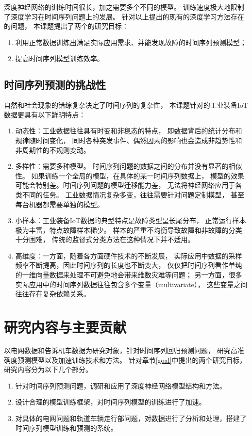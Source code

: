     深度神经网络的训练时间很长，加之需要多个不同的模型。
    训练速度极大地限制了深度学习在时间序列问题上的发展。
    针对以上提出的现有的深度学习方法存在的问题，
    本课题提出了两个的研究目标：
    \begin{enumerate}[(1)]
      \item 利用正常数据训练出满足实际应用需求、并能发现故障的时间序列预测模型；
      \item 提高时间序列模型训练效率。
    \end{enumerate}


  \subsection{时间序列预测的挑战性}
    自然和社会现象的错综复杂决定了时间序列的复杂性，
    本课题针对的工业装备IoT数据更具有以下鲜明特点：
    \begin{enumerate}[(1)]
      \item 动态性：工业数据往往具有时变和非稳态的特点，
      即数据背后的统计分布和规律随时间变化，
      同时各种突发事件、偶然因素的影响也会造成非趋势性和非周期性的不规则变动。
      \item 多样性：需要多种模型。
      时间序列问题的数据之间的分布并没有显著的相似性。
      如果训练一个全局的模型，在具体的某一时间序列数据上，
      模型的效果可能会特别差。时间序列问题的模型迁移能力差，
      无法将神经网络应用于各类不同的任务。
      工业数据情况复杂多变，往往需要针对问题定制模型，
      甚至每台机器都需要单独的模型。
      \item 小样本：工业装备IoT数据的典型特点是故障类型呈长尾分布，
      正常运行样本极为丰富，特点故障样本稀少。
      样本的严重不均衡导致故障和非故障的分类十分困难，
      传统的监督式分类方法在这种情况下并不适用。
      \item 高维度：一方面，随着各方面硬件技术的不断发展，
      实际应用中数据的采样频率不断提高，因此时间序列的长度也不断变大，
      仅仅把时间序列看作单纯的一维向量数据来处理不可避免地会带来维数灾难等问题；
      另一方面，很多实际应用中的时间序列数据往往包含多个变量（multivariate），
      这些变量之间往往存在复杂依赖关系。
    \end{enumerate}

\section{研究内容与主要贡献}
以电网数据和告诉机车数据为研究对象，针对时间序列回归预测问题，
研究高准确度预测模型以及加速训练技术和方法。
针对章节\ref{goal}中提出的两个研究目标，研究内容分为以下几个部分。
\begin{enumerate}[(1)]
  \item 针对时间序列预测问题，调研和应用了深度神经网络模型结构和方法。
  \item 设计合理的模型训练框架，对时间序列模型的训练进行了加速。
  \item 对具体的电网问题和轨道车辆走行部问题，对数据进行了分析和处理，搭建了时间序列模型训练和预测的系统。
\end{enumerate}

